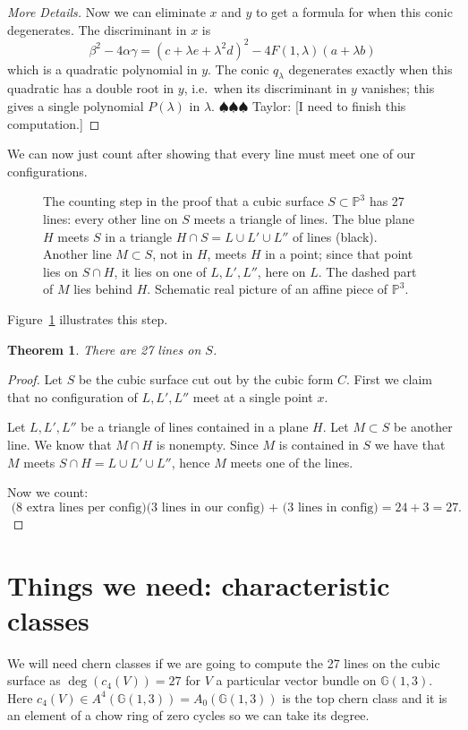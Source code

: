 \documentclass[12pt]{article}
\numberwithin{equation}{section}
\newtheorem{theorem}{Theorem}[subsection]
\theoremstyle{definition}
\theoremstyle{remark}
\newcommand{\PP}{\mathbb{P}}
\newcommand{\mult}{\operatorname{mult}}
\newcommand{\GG}{\mathbb{G}}
\newcommand{\taylor}[1]{{\color{blue} \sf $\spadesuit\spadesuit\spadesuit$ Taylor: [#1]}}
\begin{document}
\begin{proof}[More Details]
	Now we can eliminate $x$ and $y$ to get a formula for when this conic degenerates. 
	The discriminant in $x$ is  
	$$\beta^2-4\alpha \gamma = (c+\lambda e+\lambda^2 d)^2 - 4F(1,\lambda)(a+\lambda b)$$
	which is a quadratic polynomial in $y$.
	The conic $q_{\lambda}$ degenerates exactly when this quadratic has a double root in $y$, i.e.\ when its discriminant in $y$ vanishes; this gives a single polynomial $P(\lambda)$ in $\lambda$.
	\taylor{I need to finish this computation.}
\end{proof}

We can now just count after showing that every line must meet one of our configurations.
\begin{figure}[H]
\centering

\caption{The counting step in the proof that a cubic surface $S\subset\PP^3$ has 27 lines: every other line on $S$ meets a triangle of lines. The blue plane $H$ meets $S$ in a triangle $H\cap S=L\cup L'\cup L''$ of lines (black). Another line $M\subset S$, not in $H$, meets $H$ in a point; since that point lies on $S\cap H$, it lies on one of $L,L',L''$, here on $L$. The dashed part of $M$ lies behind $H$. Schematic real picture of an affine piece of $\PP^3$.}\label{fig:triangle-of-lines}
\end{figure}
Figure~\ref{fig:triangle-of-lines} illustrates this step.

\begin{theorem}
	There are 27 lines on $S$.
\end{theorem}
\begin{proof}
Let $S$ be the cubic surface cut out by the cubic form $C$. 
First we claim that no configuration of $L,L',L''$ meet at a single point $x$. 

	
Let $L,L',L''$ be a triangle of lines contained in a plane $H$. 
Let $M \subset S$ be another line.
We know that $M\cap H$ is nonempty. 
Since $M$ is contained in $S$ we have that $M$ meets $S\cap H = L\cup L' \cup L''$, hence $M$ meets one of the lines.

Now we count: 
 $$ \mbox{ ($8$ extra lines per config)($3$ lines in our config) + ($3$ lines in config)$=24+3=27$}.$$
\end{proof}

\section{Things we need: characteristic classes}
We will need chern classes if we are going to compute the 27 lines on the cubic surface as $\deg(c_4(V))=27$ for $V$ a particular vector bundle on $\GG(1,3)$. 
Here $c_4(V) \in A^4(\GG(1,3))=A_0(\GG(1,3))$ is the top chern class and it is an element of a chow ring of zero cycles so we can take its degree.
\end{document}

